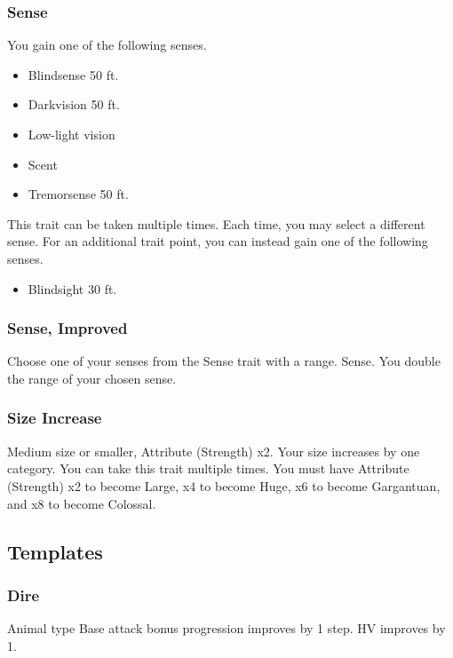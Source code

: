 \subsubsection{Sense}
\featben You gain one of the following senses.
\begin{itemize}
    \item Blindsense 50 ft.
    \item Darkvision 50 ft.
    \item Low-light vision
    \item Scent
    \item Tremorsense 50 ft.
\end{itemize}

 This trait can be taken multiple times. Each time, you may select a different sense.
 For an additional trait point, you can instead gain one of the following senses.
\begin{itemize}
    \item Blindsight 30 ft.
\end{itemize}

\subsubsection{Sense, Improved}
Choose one of your senses from the Sense trait with a range.
\featpre Sense.
\featben You double the range of your chosen sense.

\subsubsection{Size Increase}
\featpre Medium size or smaller, Attribute (Strength) x2.
\featben Your size increases by one category.
 You can take this trait multiple times. You must have Attribute (Strength) x2 to become Large, x4 to become Huge, x6 to become Gargantuan, and x8 to become Colossal.

\subsection{Templates}
\subsubsection{Dire}
\featpre Animal type
\featben Base attack bonus progression improves by 1 step. HV improves by 1.
